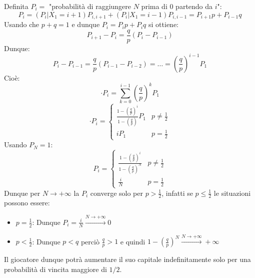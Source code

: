 Definita $P_i = $ "probabilità di raggiungere $N$ prima di $0$ partendo da $i$":
\[P_i=(P_i|X_1=i+1)P_{i,i+1}+(P_i|X_1=i-1)P_{i,i-1}=P_{i+1}p+P_{i-1}q\]
Usando che $p+q=1$ e dunque $P_i=P_ip+P_iq$ si ottiene:
\[P_{i+1}-P_i=\frac{q}{p}(P_i-P_{i-1})\]
Dunque:
\[P_i-P_{i-1}=\frac{q}{p}(P_{i-1}-P_{i-2})=\dots=\left(\frac{q}{p}\right)^{i-1}P_1\]
Cioè:
\[\cdot P_i=\sum_{k=0}^{i-1} \left (\frac{q}{p}\right)^k P_1\]
\[\cdot P_i= \begin{cases}
\frac{1-\left(\frac{q}{p}\right)^i}{1-\left(\frac{q}{p}\right)}P_1 & p\neq \frac{1}{2}
\\ iP_1 & p=\frac{1}{2}
\end{cases}\]
Usando $P_N=1$:
\[P_i= \begin{cases}
\frac{1-\left(\frac{q}{p}\right)^i}{1-\left(\frac{q}{p}\right)^N} & p\neq \frac{1}{2}
\\ \frac{i}{N} & p=\frac{1}{2}
\end{cases}\]
Dunque per $N\rightarrow+\infty$ la $P_i$ converge solo per $p>\frac{1}{2}$, infatti se $p\leq \frac{1}{2}$ le situazioni possono essere:
\begin{itemize}
    \item $p=\frac{1}{2}$: Dunque $P_i=\frac{i}{N}\xrightarrow{N\to+\infty}0$
    \item $p<\frac{1}{2}$: Dunque $p<q$ perciò $\frac{q}{p}>1$ e quindi $1-\left(\frac{q}{p}\right)^N\xrightarrow{N\to+\infty}+\infty$
\end{itemize}

Il giocatore dunque potrà aumentare il suo capitale indefinitamente solo per una probabilità di vincita maggiore di $1/2$.